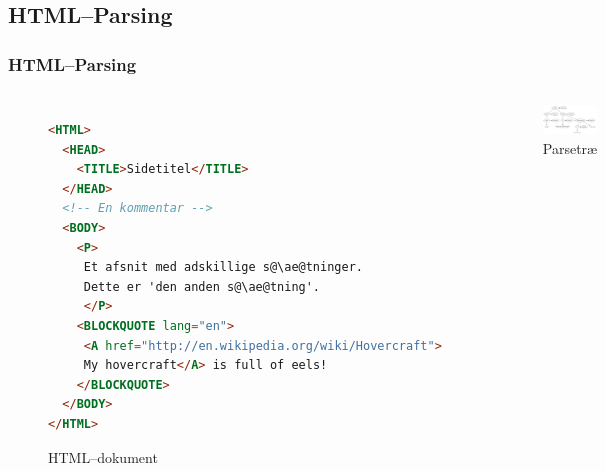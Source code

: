 \documentclass{beamer}
\begin{document}
\subsection{HTML--Parsing}
\begin{frame}[fragile]
  \frametitle{HTML--Parsing}

  \begin{columns}[t]
    \begin{figure}
\begin{lstlisting}[language=HTML, basicstyle=\tiny\ttfamily,
                   escapechar=\@]
<HTML>
  <HEAD>
    <TITLE>Sidetitel</TITLE>
  </HEAD>
  <!-- En kommentar -->
  <BODY>
    <P>
     Et afsnit med adskillige s@\ae@tninger.
     Dette er 'den anden s@\ae@tning'.
     </P>
    <BLOCKQUOTE lang="en">
     <A href="http://en.wikipedia.org/wiki/Hovercraft">
     My hovercraft</A> is full of eels!
    </BLOCKQUOTE>
  </BODY>
</HTML>
\end{lstlisting}

      \caption{HTML--dokument}
    \end{figure}

\pause

    \begin{figure}
      \includegraphics[width=\textwidth]{parsetree.pdf}
      \caption{Parsetræ}
    \end{figure}

  \end{columns}
\end{frame}
\end{document}
